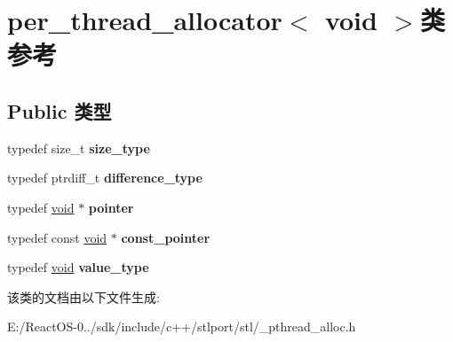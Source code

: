 \hypertarget{classper__thread__allocator_3_01void_01_4}{}\section{per\+\_\+thread\+\_\+allocator$<$ void $>$类 参考}
\label{classper__thread__allocator_3_01void_01_4}
\subsection*{Public 类型}
\begin{DoxyCompactItemize}
\item 
\mbox{\label{classper__thread__allocator_3_01void_01_4_aa808d401a14fe4a50241643e4b7274a3}} 
typedef size\+\_\+t {\bfseries size\+\_\+type}
\item 
\mbox{\label{classper__thread__allocator_3_01void_01_4_a9b4eb1f2898db954633c04710b2a1cc4}} 
typedef ptrdiff\+\_\+t {\bfseries difference\+\_\+type}
\item 
\mbox{\label{classper__thread__allocator_3_01void_01_4_aba9853bd188ffd1b2c3df174fd426d80}} 
typedef \hyperlink{interfacevoid}{void} $\ast$ {\bfseries pointer}
\item 
\mbox{\label{classper__thread__allocator_3_01void_01_4_aa22358099bd0057bf91168f596bb6673}} 
typedef const \hyperlink{interfacevoid}{void} $\ast$ {\bfseries const\+\_\+pointer}
\item 
\mbox{\label{classper__thread__allocator_3_01void_01_4_a695046575a99835897fc417f00ba89ac}} 
typedef \hyperlink{interfacevoid}{void} {\bfseries value\+\_\+type}
\end{DoxyCompactItemize}


该类的文档由以下文件生成\+:\begin{DoxyCompactItemize}
\item 
E\+:/\+React\+O\+S-\/0../sdk/include/c++/stlport/stl/\+\_\+pthread\+\_\+alloc.\+h\end{DoxyCompactItemize}
